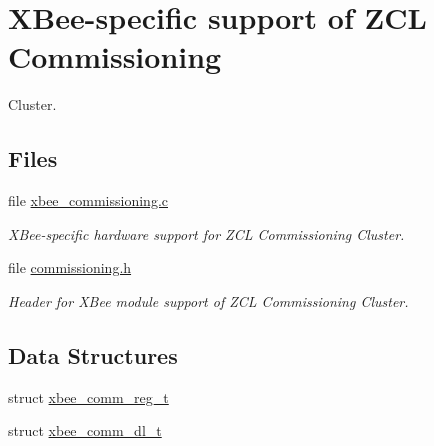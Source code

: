 \hypertarget{group__xbee__commissioning}{\section{X\-Bee-\/specific support of Z\-C\-L Commissioning}
\label{group__xbee__commissioning}
}


Cluster.  


\subsection*{Files}
\begin{DoxyCompactItemize}
\item 
file \hyperlink{xbee__commissioning_8c}{xbee\-\_\-commissioning.\-c}
\begin{DoxyCompactList}\small\item\em X\-Bee-\/specific hardware support for Z\-C\-L Commissioning Cluster. \end{DoxyCompactList}\item 
file \hyperlink{commissioning_8h}{commissioning.\-h}
\begin{DoxyCompactList}\small\item\em Header for X\-Bee module support of Z\-C\-L Commissioning Cluster. \end{DoxyCompactList}\end{DoxyCompactItemize}
\subsection*{Data Structures}
\begin{DoxyCompactItemize}
\item 
struct \hyperlink{structxbee__comm__reg__t}{xbee\-\_\-comm\-\_\-reg\-\_\-t}
\item 
struct \hyperlink{structxbee__comm__dl__t}{xbee\-\_\-comm\-\_\-dl\-\_\-t}
\end{DoxyCompactItemize}
